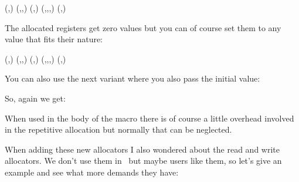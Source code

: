 \startbuffer
\begingroup
  \newlocaldimen\mydimena     {}\onepoint
  \newlocaldimen\mydimenb     {}\onepoint
  (\the\mydimena,\the\mydimenb)
  \begingroup
    \newlocaldimen\mydimena   {}\onepoint
    \newlocaldimen\mydimenb   {}\onepoint
    \newlocaldimen\mydimenc   {}\onepoint
    (\the\mydimena,\the\mydimenb,\the\mydimenc)
    \begingroup
      \newlocaldimen\mydimena {}\onepoint
      \newlocaldimen\mydimenb {}\onepoint
      (\the\mydimena,\the\mydimenb)
    \endgroup
    \newlocaldimen\mydimend   {}\onepoint
    (\the\mydimena,\the\mydimenb,\the\mydimenc,\the\mydimend)
  \endgroup
  (\the\mydimena,\the\mydimenb)
\endgroup
\stopbuffer

\typebuffer[option=TEX]

The allocated registers get zero values but you can of course set them to any
value that fits their nature:

\startlines \getbuffer \stoplines

\startbuffer
\begingroup
  \setnewlocaldimen{}\onepoint
  \setnewlocaldimen{}\onepoint
  (\the\mydimena,\the\mydimenb)
  \begingroup
    \setnewlocaldimen{}\onepoint
    \setnewlocaldimen{}\onepoint
    \setnewlocaldimen{}\onepoint
    (\the\mydimena,\the\mydimenb,\the\mydimenc)
    \begingroup
      \setnewlocaldimen{}\onepoint
      \setnewlocaldimen{}\onepoint
      (\the\mydimena,\the\mydimenb)
    \endgroup
    \setnewlocaldimen{}\onepoint
    (\the\mydimena,\the\mydimenb,\the\mydimenc,\the\mydimend)
  \endgroup
  (\the\mydimena,\the\mydimenb)
\endgroup
\stopbuffer

You can also use the next variant where you also pass the initial value:

\typebuffer[option=TEX]

So, again we get:

\startlines \getbuffer \stoplines

When used in the body of the macro there is of course a little overhead
involved in the repetitive allocation but normally that can be neglected.

\stopsectionlevel

\startsectionlevel[title=Files]

When adding these new allocators I also wondered about the read and write
allocators. We don't use them in \CONTEXT\ but maybe users like them, so let's
give an example and see what more demands they have:

